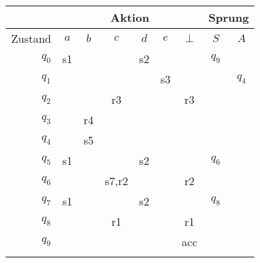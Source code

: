 \documentclass[border=0.2cm, convert={density=600}]{standalone}
\begin{document}

\begin{tabular}{|r|cccccc|cc|}
	\hline\rowcolor{lightgray}
	& \multicolumn{6}{c|}{Aktion} & \multicolumn{2}{c|}{Sprung}\\
	\hline\rowcolor{lightgray}
	Zustand & $a$ & $b$ & $c$ & $d$ & $e$ & $\bot$ &  $S$  &  $A$ \\
	\hline\rowcolor{lightergray}
	$q_0$ & s1 &    &       & s2 &    &     & $q_9$ &      \\ \rowcolor{lightgray}
	$q_1$ &    &    &       &    & s3 &     &       & $q_4$\\ \rowcolor{lightergray}
	$q_2$ &    &    &   r3  &    &    & r3  &       &      \\ \rowcolor{lightgray}
	$q_3$ &    & r4 &       &    &    &     &       &      \\ \rowcolor{lightergray}
	$q_4$ &    & s5 &       &    &    &     &       &      \\ \rowcolor{lightgray}
	$q_5$ & s1 &    &       & s2 &    &     & $q_6$ &      \\ \rowcolor{lightergray}
	$q_6$ &    &    & s7,r2 &    &    & r2  &       &      \\ \rowcolor{lightgray}
	$q_7$ & s1 &    &       & s2 &    &     & $q_8$ &      \\ \rowcolor{lightergray}
	$q_8$ &    &    &   r1  &    &    & r1  &       &      \\ \rowcolor{lightgray}
	$q_9$ &    &    &       &    &    & acc &       &      \\ \rowcolor{lightergray}
	\hline
\end{tabular}
\end{document}
